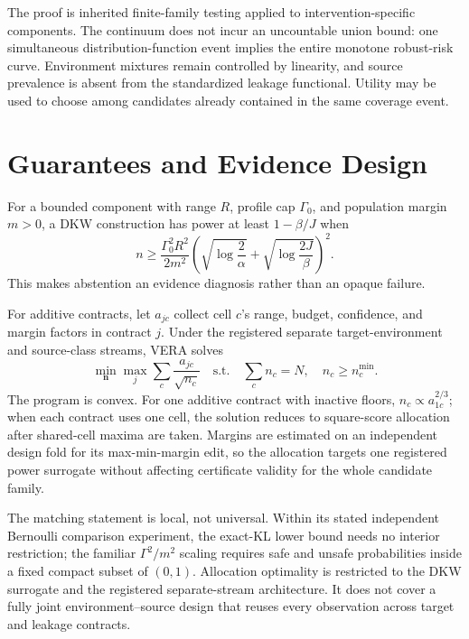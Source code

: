 The proof is inherited finite-family testing applied to intervention-specific
components. The continuum does not incur an uncountable union bound: one
simultaneous distribution-function event implies the entire monotone robust-risk
curve. Environment mixtures remain controlled by linearity, and source
prevalence is absent from the standardized leakage functional. Utility may be
used to choose among candidates already contained in the same coverage event.

\section{Guarantees and Evidence Design}
\label{iclr:sec:evidence}

For a bounded component with range $R$, profile cap $\Gamma_0$, and population
margin $m>0$, a DKW construction has power at least $1-\beta/J$ when
\begin{equation}
n\ge \frac{\Gamma_0^2R^2}{2m^2}
\left(\sqrt{\log\frac{2}{\alpha}}+
\sqrt{\log\frac{2J}{\beta}}\right)^2.
\label{iclr:eq:sample-size}
\end{equation}
This makes abstention an evidence diagnosis rather than an opaque failure.

For additive contracts, let $a_{jc}$ collect cell $c$'s range, budget,
confidence, and margin factors in contract $j$. Under the registered separate
target-environment and source-class streams, VERA solves
\begin{equation}
\min_{\boldsymbol n}\max_j\sum_c\frac{a_{jc}}{\sqrt{n_c}}
\quad\text{s.t.}\quad \sum_cn_c=N,\quad n_c\ge n_c^{\min}.
\label{iclr:eq:allocation}
\end{equation}
The program is convex. For one additive contract with inactive floors,
$n_c\propto a_{1c}^{2/3}$; when each contract uses one cell, the solution
reduces to square-score allocation after shared-cell maxima are taken. Margins
are estimated on an independent design fold for its max-min-margin edit, so the
allocation targets one registered power surrogate without affecting
certificate validity for the whole candidate family.

The matching statement is local, not universal. Within its stated independent
Bernoulli comparison experiment, the exact-KL lower bound needs no interior
restriction; the familiar $\Gamma^2/m^2$ scaling requires safe and unsafe
probabilities inside a fixed compact subset of $(0,1)$. Allocation
optimality is restricted to the DKW surrogate and the registered separate-stream
architecture. It does not cover a fully joint environment--source design that
reuses every observation across target and leakage contracts.

